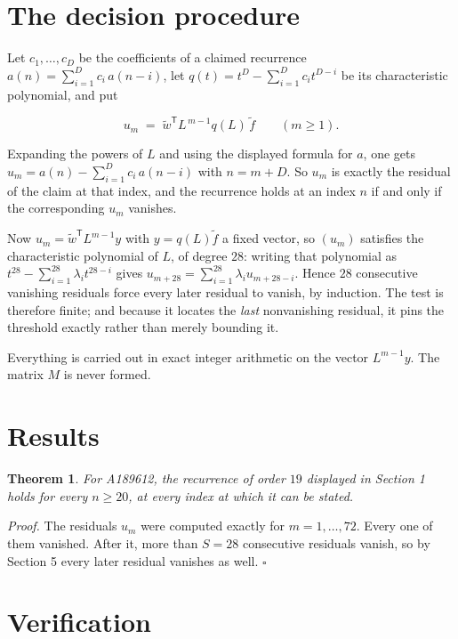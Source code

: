 \documentclass[11pt]{article}
\newtheorem{theorem}{Theorem}
\theoremstyle{definition}
\begin{document}
\section{The decision procedure}

Let $c_1,\dots,c_D$ be the coefficients of a claimed recurrence $a(n) = \sum_{i=1}^{D} c_i\,a(n-i)$, let $q(t) = t^{D} - \sum_{i=1}^{D} c_i t^{D-i}$ be its characteristic polynomial, and put

\[u_m \;=\; \tilde w^{\mathsf T} L^{\,m-1} q(L)\,\tilde f \qquad (m \ge 1).\]

Expanding the powers of $L$ and using the displayed formula for $a$, one gets $u_m = a(n) - \sum_{i=1}^{D} c_i\,a(n-i)$ with $n = m + D$. So $u_m$ is exactly the residual of the claim at that index, and the recurrence holds at an index $n$ if and only if the corresponding $u_m$ vanishes.

Now $u_m = \tilde w^{\mathsf T} L^{m-1} y$ with $y = q(L)\tilde f$ a fixed vector, so $(u_m)$ satisfies the characteristic polynomial of $L$, of degree $28$: writing that polynomial as $t^{28} - \sum_{i=1}^{28} \lambda_i t^{28-i}$ gives $u_{m+28} = \sum_{i=1}^{28} \lambda_i u_{m+28-i}$. Hence $28$ consecutive vanishing residuals force every later residual to vanish, by induction. The test is therefore finite; and because it locates the {\itshape last} nonvanishing residual, it pins the threshold exactly rather than merely bounding it.

Everything is carried out in exact integer arithmetic on the vector $L^{m-1}y$. The matrix $M$ is never formed.

\section{Results}

\begin{theorem} For A189612, the recurrence of order $19$ displayed in Section 1 holds for every $n \ge 20$, at every index at which it can be stated.\end{theorem}

{\itshape Proof.} The residuals $u_m$ were computed exactly for $m = 1,\dots,72$. Every one of them vanished. After it, more than $S = 28$ consecutive residuals vanish, so by Section 5 every later residual vanishes as well. $\square$

\section{Verification}
\end{document}
